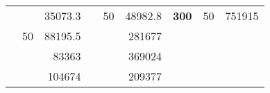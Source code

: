 \begin{table}[]
\begin{tabular}{|ccrccrccc}
\rowcolor[HTML]{DDFDFF} 
\multicolumn{1}{|c|}{\cellcolor[HTML]{FFFFC7}}                                & \multicolumn{1}{c|}{\cellcolor[HTML]{DDFDFF}}                      & \multicolumn{1}{r|}{\cellcolor[HTML]{DAE8FC}35073.3}   & \multicolumn{1}{c|}{\cellcolor[HTML]{FFFFC7}}                                & \multicolumn{1}{c|}{\multirow{-10}{*}{\cellcolor[HTML]{DDFDFF}50}}  & \multicolumn{1}{r|}{\cellcolor[HTML]{DDFDFF}48982.8}   & \multicolumn{1}{c|}{\multirow{-19}{*}{\cellcolor[HTML]{FFFFC7}\textbf{300}}} & \multicolumn{1}{c|}{\multirow{-10}{*}{\cellcolor[HTML]{DDFDFF}50}} & \multicolumn{1}{r|}{\cellcolor[HTML]{DDFDFF}751915}    \\ \cline{3-3} \cline{5-9} 
\multicolumn{1}{|c|}{\cellcolor[HTML]{FFFFC7}}                                & \multicolumn{1}{c|}{\multirow{-10}{*}{\cellcolor[HTML]{DDFDFF}50}} & \multicolumn{1}{r|}{\cellcolor[HTML]{DDFDFF}88195.5}   & \multicolumn{1}{c|}{\cellcolor[HTML]{FFFFC7}}                                & \multicolumn{1}{c|}{\cellcolor[HTML]{DAE8FC}}                       & \multicolumn{1}{r|}{\cellcolor[HTML]{DAE8FC}281677}    &                                                                              &                                                                    &                                                        \\ \cline{2-3} \cline{6-6}
\multicolumn{1}{|c|}{\cellcolor[HTML]{FFFFC7}}                                & \multicolumn{1}{c|}{\cellcolor[HTML]{DAE8FC}}                      & \multicolumn{1}{r|}{\cellcolor[HTML]{DAE8FC}83363}     & \multicolumn{1}{c|}{\cellcolor[HTML]{FFFFC7}}                                & \multicolumn{1}{c|}{\cellcolor[HTML]{DAE8FC}}                       & \multicolumn{1}{r|}{\cellcolor[HTML]{DDFDFF}369024}    &                                                                              &                                                                    &                                                        \\ \cline{3-3} \cline{6-6}
\multicolumn{1}{|c|}{\cellcolor[HTML]{FFFFC7}}                                & \multicolumn{1}{c|}{\cellcolor[HTML]{DAE8FC}}                      & \multicolumn{1}{r|}{\cellcolor[HTML]{DDFDFF}104674}    & \multicolumn{1}{c|}{\cellcolor[HTML]{FFFFC7}}                                & \multicolumn{1}{c|}{\cellcolor[HTML]{DAE8FC}}                       & \multicolumn{1}{r|}{\cellcolor[HTML]{DAE8FC}209377}    &                                                                              &                                                                    &                                                        \\ \cline{3-3} \cline{6-6}

\end{tabular}
\end{table}
